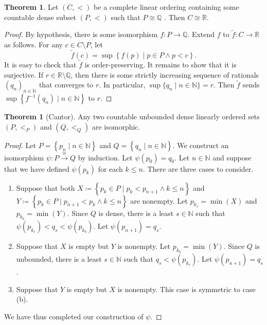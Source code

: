 \documentclass[10pt,letterpaper,cm]{nupset}
\theoremstyle{definition}
\theoremstyle{theorem}
\newtheorem{theorem}[definition]{Theorem}
\theoremstyle{remark}
\newcommand{\N}{\mathbb N}
\newcommand{\Q}{\mathbb Q}
\newcommand{\R}{\mathbb R}
\newcommand{\1}{\mathbf{1}}
\newcommand{\0}{\vec 0}
\begin{document}
\begin{theorem}
 Let $\left(C, <\right)$ be a complete linear ordering  containing some countable dense subset $\left(P, <\right)$ such that $P \cong \Q$ . Then $C\cong \R$. 
\end{theorem}
\begin{proof} 
 By hypothesis, there is some isomorphism $f: P \to \Q$. Extend $f$ to $\tilde{f} : C \to \R$ as follows. For any $c \in C \setminus P$, let $$\tilde{f}(c)  = \sup\left\{f(p) \mid p\in P \land p < c\right\}.$$ It is easy to check that $\tilde{f}$ is order-preserving. It remains to show that it is surjective. If $r\in \R \setminus \Q$, then there is some strictly increasing sequence of rationals $\left(q_n\right)_{n\in \N}$ that converges to $r$. In particular, $\sup\{q_n \mid n\in \N\}  = r$. Then $\tilde{f}$ sends $\sup\left\{f^{-1}(q_n) \mid n \in \N\right\}$ to $r$.
\end{proof}

\smallskip

\begin{theorem}[Cantor]
 Any two countable unbounded dense linearly ordered sets $\left(P, <_P\right)$ and $\left(Q, <_Q\right)$ are isomorphic. 
\end{theorem}
\begin{proof} 
Let $P = \left\{p_n \mid n \in \N\right\}$ and $Q = \left\{q_n \mid n\in \N\right\}$. We construct an isomorphism $\psi : P \overset{\cong}{\longrightarrow} Q$ by induction. Let $\psi(p_0)= q_0$. Let $n\in \N$ and suppose that we have defined $\psi(p_k)$ for each $k\leq n$. There are three cases to consider.
\begin{enumerate}[label=(\alph*)]
\item Suppose that both $X\coloneqq \left\{ p_k \in P \mid p_k < p_{n+1} \land k \leq n\right\}$ and $Y \coloneqq \left\{ p_k \in P \mid p_{n+1} < p_k \land k \leq n\right\}$  are nonempty. Let $p_{k_s} = \min(X)$ and $p_{k_b} = \min(Y)$. Since $Q$ is dense, there is a least $s\in \N$ such that $\psi(p_{k_s}) < q_s < \psi(p_{k_b})$. Let $\psi(p_{n+1}) = q_s$. 
\item Suppose that $X$ is empty but $Y$ is nonempty. Let $p_{k_b} = \min(Y)$. Since $Q$ is unbounded, there is a least $s\in \N$ such that $q_s < \psi(p_{k_s})$. Let $\psi(p_{n+1}) = q_s$. 
\item Suppose that  $Y$ is empty but $X$ is nonempty. This case is symmetric to case (b).
\end{enumerate}
We have thus completed our construction of $\psi$.
\end{proof}
\end{document}
